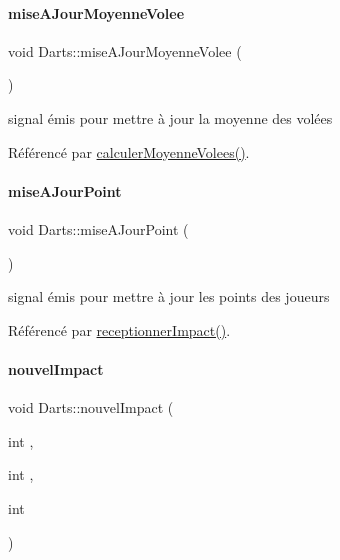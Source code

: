 \paragraph{\texorpdfstring{mise\+A\+Jour\+Moyenne\+Volee}{miseAJourMoyenneVolee}}
{\footnotesize\ttfamily void Darts\+::mise\+A\+Jour\+Moyenne\+Volee (\begin{DoxyParamCaption}{ }\end{DoxyParamCaption})\hspace{0.3cm}{\ttfamily [signal]}}



signal émis pour mettre à jour la moyenne des volées 



Référencé par \hyperlink{darts_8cpp_source_l00387}{calculer\+Moyenne\+Volees()}.

\mbox{\label{class_darts_a455fa1efac223393aff2afbd33352569}} 
\paragraph{\texorpdfstring{mise\+A\+Jour\+Point}{miseAJourPoint}}
{\footnotesize\ttfamily void Darts\+::mise\+A\+Jour\+Point (\begin{DoxyParamCaption}{ }\end{DoxyParamCaption})\hspace{0.3cm}{\ttfamily [signal]}}



signal émis pour mettre à jour les points des joueurs 



Référencé par \hyperlink{darts_8cpp_source_l00223}{receptionner\+Impact()}.

\mbox{\label{class_darts_aae5288e0c0f09a9837bcb7a517ede5af}} 
\paragraph{\texorpdfstring{nouvel\+Impact}{nouvelImpact}}
{\footnotesize\ttfamily void Darts\+::nouvel\+Impact (\begin{DoxyParamCaption}\item[{int}]{,  }\item[{int}]{,  }\item[{int}]{ }\end{DoxyParamCaption})\hspace{0.3cm}{\ttfamily [signal]}}




